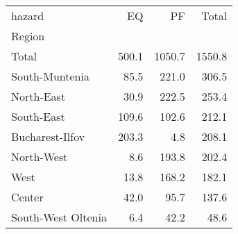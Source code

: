 \begin{tabular}{lrrr}
\toprule
hazard &     EQ &      PF &   Total \\
Region             &        &         &         \\
\midrule
Total              &  500.1 &  1050.7 &  1550.8 \\
South-Muntenia     &   85.5 &   221.0 &   306.5 \\
North-East         &   30.9 &   222.5 &   253.4 \\
South-East         &  109.6 &   102.6 &   212.1 \\
Bucharest-Ilfov    &  203.3 &     4.8 &   208.1 \\
North-West         &    8.6 &   193.8 &   202.4 \\
West               &   13.8 &   168.2 &   182.1 \\
Center             &   42.0 &    95.7 &   137.6 \\
South-West Oltenia &    6.4 &    42.2 &    48.6 \\
\bottomrule
\end{tabular}
